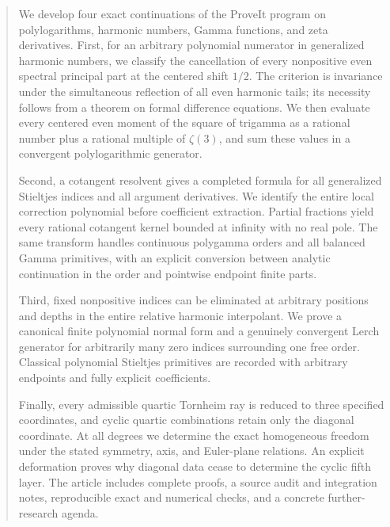 \begin{abstract}
We develop four exact continuations of the ProveIt program on
polylogarithms, harmonic numbers, Gamma functions, and zeta derivatives.
First, for an arbitrary polynomial numerator in generalized harmonic
numbers, we classify the cancellation of every nonpositive even
spectral principal part at the centered shift $1/2$. The criterion is
invariance under the simultaneous reflection of all even harmonic
tails; its necessity follows from a theorem on formal difference
equations. We then evaluate every centered even moment of the square
of trigamma as a rational number plus a rational multiple of $\zeta(3)$,
and sum these values in a convergent polylogarithmic generator.

Second, a cotangent resolvent gives a completed formula for all
generalized Stieltjes indices and all argument derivatives. We
identify the entire local correction polynomial before coefficient
extraction. Partial fractions yield every rational cotangent kernel
bounded at infinity with no real pole. The same transform handles
continuous polygamma orders and all balanced Gamma primitives, with
an explicit conversion between analytic continuation in the order
and pointwise endpoint finite parts.

Third, fixed nonpositive indices can be eliminated at arbitrary
positions and depths in the entire relative harmonic interpolant.
We prove a canonical finite polynomial normal form and a genuinely
convergent Lerch generator for arbitrarily many zero indices surrounding
one free order. Classical polynomial Stieltjes primitives are recorded
with arbitrary endpoints and fully explicit coefficients.

Finally, every admissible quartic Tornheim ray is reduced to three
specified coordinates, and cyclic quartic combinations retain only
the diagonal coordinate. At all degrees we determine the exact
homogeneous freedom under the stated symmetry, axis, and Euler-plane
relations. An explicit deformation proves why diagonal data cease
to determine the cyclic fifth layer. The article includes complete
proofs, a source audit and integration notes, reproducible exact and numerical
checks, and a concrete further-research agenda.
\end{abstract}

